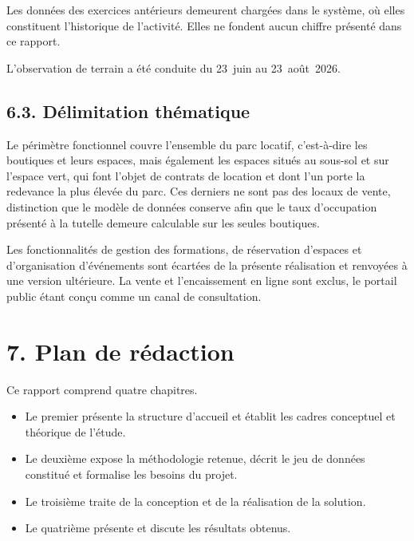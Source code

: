 Les données des exercices antérieurs demeurent chargées dans le système, où elles constituent l'historique de l'activité. Elles ne fondent aucun chiffre présenté dans ce rapport.

L'observation de terrain a été conduite du 23~juin au 23~août~2026.

\subsection*{6.3. Délimitation thématique}

Le périmètre fonctionnel couvre l'ensemble du parc locatif, c'est-à-dire les boutiques et leurs espaces, mais également les espaces situés au sous-sol et sur l'espace vert, qui font l'objet de contrats de location et dont l'un porte la redevance la plus élevée du parc. Ces derniers ne sont pas des locaux de vente, distinction que le modèle de données conserve afin que le taux d'occupation présenté à la tutelle demeure calculable sur les seules boutiques.

Les fonctionnalités de gestion des formations, de réservation d'espaces et d'organisation d'événements sont écartées de la présente réalisation et renvoyées à une version ultérieure. La vente et l'encaissement en ligne sont exclus, le portail public étant conçu comme un canal de consultation.

\section*{7. Plan de rédaction}

Ce rapport comprend quatre chapitres.

\begin{itemize}[leftmargin=1.6em,itemsep=0.2em]
\item Le premier présente la structure d'accueil et établit les cadres conceptuel et théorique de l'étude.
\item Le deuxième expose la méthodologie retenue, décrit le jeu de données constitué et formalise les besoins du projet.
\item Le troisième traite de la conception et de la réalisation de la solution.
\item Le quatrième présente et discute les résultats obtenus.
\end{itemize}
